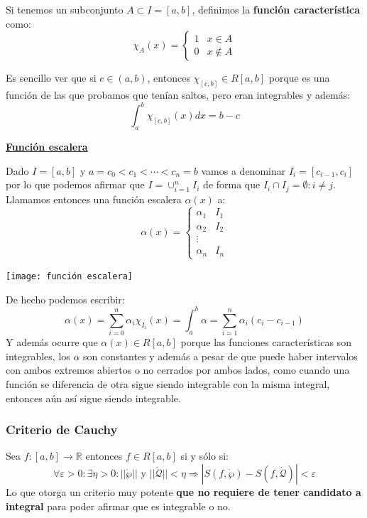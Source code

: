 \documentclass[10pt,a4paper,openright]{book}
\begin{document}
Si tenemos un subconjunto $A\subset I=[a,b]$, definimos la \textbf{función característica} como:
$$\chi_A(x)=\begin{cases}1 & x\in A \\ 0 & x\notin A\end{cases}$$

Es sencillo ver que si $c\in (a,b)$, entonces $\chi_{[c,b]}\in R[a,b]$ porque es una función de las que probamos que tenían saltos, pero eran integrables y además:
$$\int_{a}^{b}\chi_{[c,b]}(x)dx=b-c$$

\underline{\textbf{Función escalera}}

Dado $I=[a,b]$ y $a=c_0< c_1 <\cdots < c_n=b$ vamos a denominar $I_i=[c_{i-1},c_i]$ por lo que podemos afirmar que $I=\cup_{i=1}^n I_i$ de forma que $I_i\cap I_j = \emptyset : i\neq j$. Llamamos entonces una función escalera $\alpha(x)$ a:
$$\alpha(x)=\begin{cases} \alpha_1 & I_1 \\ \alpha_2 & I_2 \\ \vdots \\ \alpha_n & I_n \end{cases}$$
\begin{center}
\texttt{[image: función escalera]}
\end{center}
De hecho podemos escribir:
$$\alpha(x)=\sum_{i=0}^{n}\alpha_i\chi_{I_i}(x) = \int_{a}^{b}\alpha = \sum_{i=1}^{n}\alpha_i (c_i-c_{i-1})$$
Y además ocurre que $\alpha(x)\in R[a,b]$ porque las funciones características son integrables, los $\alpha$ son constantes y además a pesar de que puede haber intervalos con ambos extremos abiertos o no cerrados por ambos lados, como cuando una función se diferencia de otra sigue siendo integrable con la misma integral, entonces aún así sigue siendo integrable.

\subsubsection*{Criterio de Cauchy}
Sea $f:[a,b]\rightarrow \mathbb R$ entonces $f\in R[a,b]$ si y sólo si:
$$\forall \varepsilon > 0: \exists \eta > 0 : ||\mathring{\wp}|| \mbox{ y } ||\mathring{\mathcal{Q}}|| < \eta \Rightarrow \left| S(f,\mathring{\wp})- S(f, \mathring{\mathcal{Q}})\right| < \varepsilon $$
Lo que otorga un criterio muy potente \textbf{que no requiere de tener candidato a integral} para poder afirmar que es integrable o no.
\end{document}
